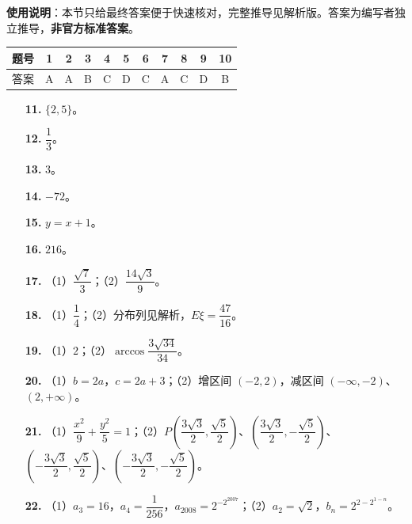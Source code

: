 
\begin{gknotice}
\textbf{使用说明}：本节只给最终答案便于快速核对，完整推导见解析版。答案为编写者独立推导，\textbf{非官方标准答案}。
\end{gknotice}

\begin{center}\begin{tabular}{ccccccccccc}
\toprule
题号 & 1 & 2 & 3 & 4 & 5 & 6 & 7 & 8 & 9 & 10 \\
\midrule
答案 & A & A & B & C & D & C & A & C & D & B \\
\bottomrule
\end{tabular}\end{center}

\begin{itemize}[leftmargin=2.6em]
  \item[\textbf{11.}] $\{2,5\}$。
  \item[\textbf{12.}] $\dfrac13$。
  \item[\textbf{13.}] $3$。
  \item[\textbf{14.}] $-72$。
  \item[\textbf{15.}] $y=x+1$。
  \item[\textbf{16.}] $216$。
\end{itemize}

\begin{itemize}[leftmargin=2.6em]
  \item[\textbf{17.}] （1）$\dfrac{\sqrt7}3$；（2）$\dfrac{14\sqrt3}9$。
  \item[\textbf{18.}] （1）$\dfrac14$；（2）分布列见解析，$E\xi=\dfrac{47}{16}$。
  \item[\textbf{19.}] （1）$2$；（2）$\arccos\dfrac{3\sqrt{34}}{34}$。
  \item[\textbf{20.}] （1）$b=2a$，$c=2a+3$；（2）增区间 $(-2,2)$，减区间 $(-\infty,-2)$、$(2,+\infty)$。
  \item[\textbf{21.}] （1）$\dfrac{x^2}9+\dfrac{y^2}5=1$；（2）$P\left(\dfrac{3\sqrt3}2,\dfrac{\sqrt5}2\right)$、$\left(\dfrac{3\sqrt3}2,-\dfrac{\sqrt5}2\right)$、$\left(-\dfrac{3\sqrt3}2,\dfrac{\sqrt5}2\right)$、$\left(-\dfrac{3\sqrt3}2,-\dfrac{\sqrt5}2\right)$。
  \item[\textbf{22.}] （1）$a_3=16$，$a_4=\dfrac1{256}$，$a_{2008}=2^{-2^{2007}}$；（2）$a_2=\sqrt2$，$b_n=2^{2-2^{1-n}}$。
\end{itemize}
